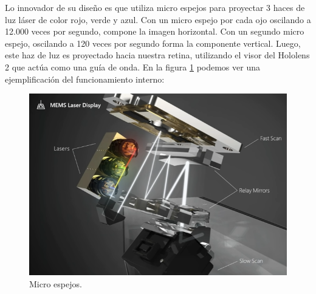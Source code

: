 \begin{table}[htpb]
	\centering
	\caption[Hardware Hololens 2]{Especificaciones técnicas}
	\label{tab:holotab}
\end{table}

Lo innovador de su diseño es que utiliza micro espejos para proyectar 3 haces de luz láser de color rojo, verde y azul. Con un micro espejo por cada ojo oscilando a 12.000 veces por segundo, compone la imagen horizontal. Con un segundo micro espejo, oscilando a 120 veces por segundo forma la componente vertical. Luego,
este haz de luz es proyectado hacia nuestra retina, utilizando el visor del Hololens 2 que actúa como una guía de onda. En la figura \ref{fig:Lasers} podemos ver una ejemplificación del funcionamiento interno:

\begin{figure}[htpb]
	\centering
	\includegraphics[width=\textwidth]{./Figures/Lasers.png}
	\caption{Micro espejos\protect\footnotemark.}
	\label{fig:Lasers}
\end{figure}

